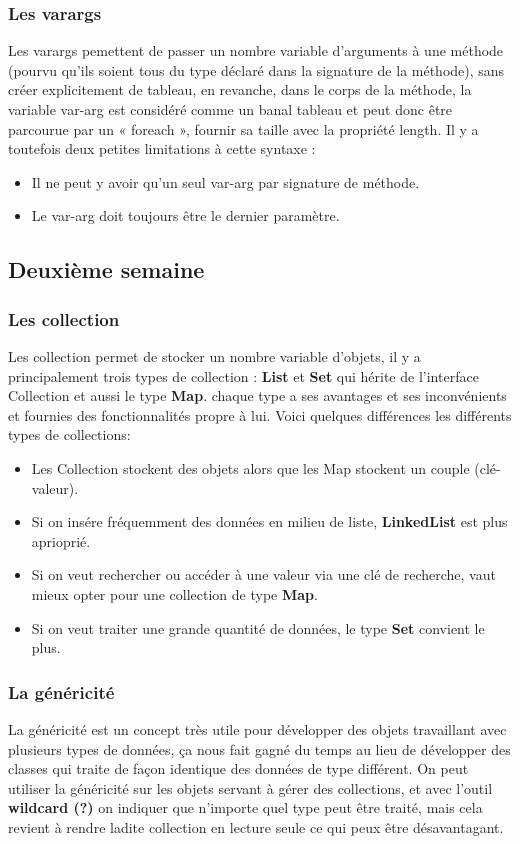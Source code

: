 \documentclass[12pt]{article}
\begin{document}
\subsubsection{Les varargs}
Les varargs pemettent de passer un nombre variable d’arguments à une méthode (pourvu qu’ils soient tous du type déclaré dans la signature de la méthode), sans créer explicitement de tableau, en revanche, dans le corps de la méthode, la variable var-arg est considéré comme un banal tableau et peut donc être parcourue par un « foreach », fournir sa taille avec la propriété length.
Il y a toutefois deux petites limitations à cette syntaxe :
\begin{itemize}
\item Il ne peut y avoir qu’un seul var-arg par signature de méthode.
\item Le var-arg doit toujours être le dernier paramètre.
\end{itemize}

\subsection{Deuxième semaine}

\subsubsection{Les collection}
Les collection permet de stocker un nombre variable d'objets, il y a principalement trois types de collection : \textbf{List} et \textbf{Set} qui hérite de l'interface Collection et aussi le type \textbf{Map}. chaque type a ses avantages et ses inconvénients et fournies des fonctionnalités propre à lui.\newline
Voici quelques différences les différents types de collections:
\begin{itemize}
\item Les Collection stockent des objets alors que les Map stockent un couple (clé-valeur).
\item Si on insére fréquemment des données en milieu de liste, \textbf{LinkedList} est plus aprioprié.
\item Si on veut rechercher ou accéder à une valeur via une clé de recherche, vaut mieux opter pour une collection de type \textbf{Map}.
\item Si on veut traiter une grande quantité de données, le type \textbf{Set} convient le plus.
\end{itemize}

\subsubsection{La généricité}
La généricité est un concept très utile pour développer des objets travaillant avec plusieurs types de données, ça nous fait gagné du temps au lieu de développer des classes qui traite de façon identique des données de type différent.\newline
On peut utiliser la généricité sur les objets servant à gérer des collections, et avec l'outil \textbf{wildcard (?)} on indiquer que n'importe quel type peut être traité, mais cela revient à rendre ladite collection en lecture seule ce qui peux être désavantagant. 
\end{document}
